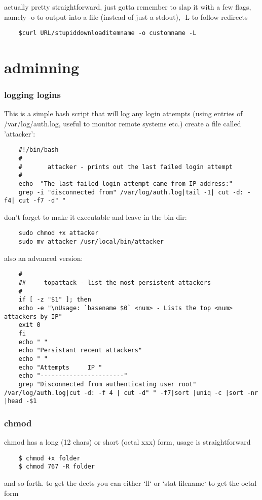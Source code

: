 actually pretty straightforward, just gotta remember to slap it with a few flags, namely -o to output into a file (instead of just a stdout), -L to follow redirects
\begin{verbatim}
	$curl URL/stupiddownloaditemname -o customname -L
\end{verbatim}
\section{adminning}%
\label{sec:adminning}

\subsubsection{logging logins}%
\label{ssub:logging_logins}

This is a simple bash script that will log any login attempts (using entries of /var/log/auth.log, useful to monitor remote systems etc.)
create a file called 'attacker':
\begin{verbatim}
	#!/bin/bash
	#
	#       attacker - prints out the last failed login attempt
	#
	echo  "The last failed login attempt came from IP address:"
	grep -i "disconnected from" /var/log/auth.log|tail -1| cut -d: -f4| cut -f7 -d" "
\end{verbatim}
don't forget to make it executable and leave in the bin dir:
\begin{verbatim}
	sudo chmod +x attacker
	sudo mv attacker /usr/local/bin/attacker
\end{verbatim}

also an advanced version:
\begin{verbatim}
	#
	##     topattack - list the most persistent attackers
	#
	if [ -z "$1" ]; then
	echo -e "\nUsage: `basename $0` <num> - Lists the top <num> attackers by IP"
	exit 0
	fi
	echo " "
	echo "Persistant recent attackers"
	echo " "
	echo "Attempts     IP "
	echo "-----------------------"
	grep "Disconnected from authenticating user root" /var/log/auth.log|cut -d: -f 4 | cut -d" " -f7|sort |uniq -c |sort -nr |head -$1
\end{verbatim}

\subsubsection{chmod}%
\label{ssub:chmod}

chmod has a long (12 chars) or short (octal xxx) form, usage is straightforward
\begin{verbatim}
	$ chmod +x folder
	$ chmod 767 -R folder
\end{verbatim}
and so forth. to get the deets you can either `ll` or `stat filename` to get the octal form

